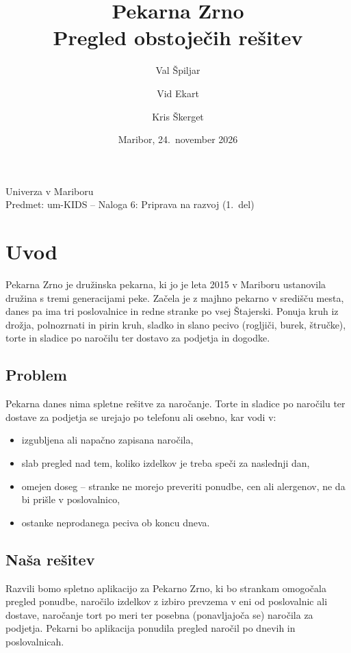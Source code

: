 \documentclass[11pt,a4paper]{article}
\title{\textbf{Pekarna Zrno}\\[4pt]
\large Pregled obstoječih rešitev}
\author{
  Val Špiljar \and
  Vid Ekart \and
  Kris Škerget 
}
\date{Maribor, 24.\ november 2026}
\begin{document}
\maketitle
\thispagestyle{empty}

\begin{center}
\small Univerza v Mariboru \\
Predmet: um-KIDS \quad -- \quad Naloga 6: Priprava na razvoj (1.\ del)
\end{center}

\vspace{1em}
\tableofcontents
\newpage

\section{Uvod}

Pekarna Zrno je družinska pekarna, ki jo je leta 2015 v Mariboru ustanovila
družina s tremi generacijami peke. Začela je z majhno pekarno v središču mesta,
danes pa ima tri poslovalnice in redne stranke po vsej Štajerski. Ponuja kruh iz
drožja, polnozrnati in pirin kruh, sladko in slano pecivo (rogljiči, burek,
štručke), torte in sladice po naročilu ter dostavo za podjetja in dogodke.

\subsection*{Problem}
Pekarna danes nima spletne rešitve za naročanje. Torte in sladice po naročilu ter
dostave za podjetja se urejajo po telefonu ali osebno, kar vodi v:
\begin{itemize}
  \item izgubljena ali napačno zapisana naročila,
  \item slab pregled nad tem, koliko izdelkov je treba speči za naslednji dan,
  \item omejen doseg -- stranke ne morejo preveriti ponudbe, cen ali alergenov,
        ne da bi prišle v poslovalnico,
  \item ostanke neprodanega peciva ob koncu dneva.
\end{itemize}

\subsection*{Naša rešitev}
Razvili bomo spletno aplikacijo za Pekarno Zrno, ki bo strankam omogočala pregled
ponudbe, naročilo izdelkov z izbiro prevzema v eni od poslovalnic ali dostave,
naročanje tort po meri ter posebna (ponavljajoča se) naročila za podjetja. Pekarni
bo aplikacija ponudila pregled naročil po dnevih in poslovalnicah.
\end{document}
